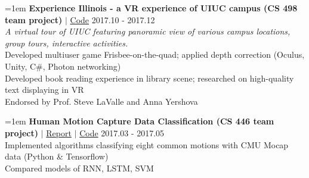 \documentclass[10pt]{article}
\begin{document}
\hangindent=1em
\textbf{Experience Illinois - a VR experience of UIUC campus (CS 498 team project)} $|$ \href{https://github.com/liujch1998/Illinois-Experience}{Code} \hfill 2017.10 - 2017.12 \\
\textit{A virtual tour of UIUC featuring panoramic view of various campus locations, group tours, interactive activities. } \\
Developed multiuser game Frisbee-on-the-quad; applied depth correction (Oculus, Unity, C\#, Photon networking) \\
Developed book reading experience in library scene; researched on high-quality text displaying in VR \\
Endorsed by Prof. Steve LaValle and Anna Yershova

\hangindent=1em
\textbf{Human Motion Capture Data Classification (CS 446 team project)} $|$ \href{https://github.com/liujch1998/MocapClassification/blob/master/report/report.pdf}{Report} $|$ \href{https://github.com/liujch1998/MocapClassification}{Code} \hfill 2017.03 - 2017.05 \\
Implemented algorithms classifying eight common motions with CMU Mocap data (Python \& Tensorflow) \\
Compared models of RNN, LSTM, SVM
\end{document}
